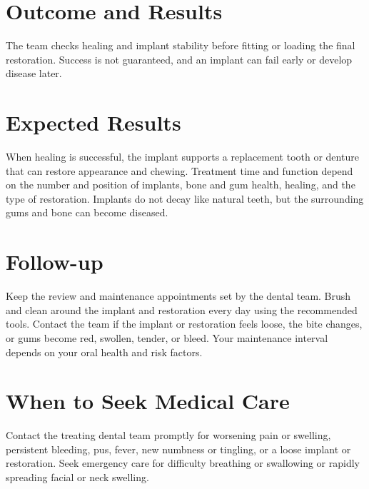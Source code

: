 \section*{Outcome and Results}
The team checks healing and implant stability before fitting or loading the final restoration. Success is not guaranteed, and an implant can fail early or develop disease later.

\section*{Expected Results}
When healing is successful, the implant supports a replacement tooth or denture that can restore appearance and chewing. Treatment time and function depend on the number and position of implants, bone and gum health, healing, and the type of restoration. Implants do not decay like natural teeth, but the surrounding gums and bone can become diseased.

\section*{Follow-up}
Keep the review and maintenance appointments set by the dental team. Brush and clean around the implant and restoration every day using the recommended tools. Contact the team if the implant or restoration feels loose, the bite changes, or gums become red, swollen, tender, or bleed. Your maintenance interval depends on your oral health and risk factors.

\section*{When to Seek Medical Care}
Contact the treating dental team promptly for worsening pain or swelling, persistent bleeding, pus, fever, new numbness or tingling, or a loose implant or restoration. Seek emergency care for difficulty breathing or swallowing or rapidly spreading facial or neck swelling.

